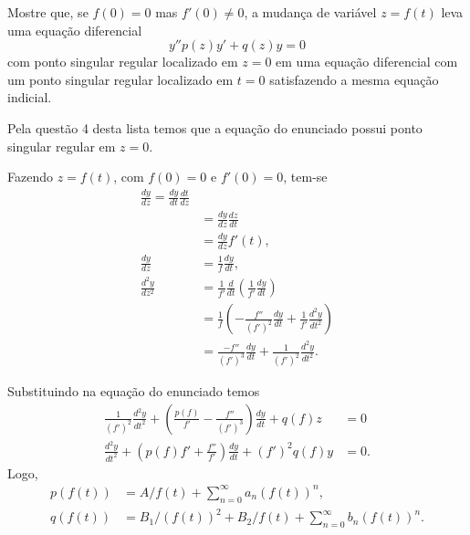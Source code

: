 \documentclass[a4paper,12pt, leqno, answers]{exam}
\begin{document}
\begin{questions}
    \question Mostre que, se $f(0) = 0$ mas $f'(0) \neq 0$, a mudan\c{c}a de vari\'{a}vel $z = f(t)$ leva uma equa\c{c}\~{a}o diferencial
    \[
    y''  p(z) y' + q(z) y = 0
    \]
    com ponto singular regular localizado em $z = 0$ em uma equa\c{c}\~{a}o diferencial com um ponto singular regular localizado em $t = 0$ satisfazendo a mesma equa\c{c}\~{a}o indicial.
    \begin{solution}
        Pela quest\~{a}o 4 desta lista temos que a equa\c{c}\~{a}o do enunciado possui ponto singular regular em $z = 0$.

        Fazendo $z = f(t)$, com $f(0) = 0$ e $f'(0) = 0$, tem-se
        \begin{align*}
            \frac{d y}{d z} = \frac{d y}{d t} \frac{d t}{d z} \\
            &= \frac{d y}{d z} \frac{d z}{d t} \\
            &= \frac{d y}{d z} f'(t), \\
            \frac{d y}{d z} &= \frac{1}{f} \frac{d y}{d t}, \\
            \frac{d^2 y}{d z^2} &= \frac{1}{f'} \frac{d}{d t} \left( \frac{1}{f'} \frac{d y}{d t} \right) \\
            &= \frac{1}{f} \left( - \frac{f''}{\left( f' \right)^2} \frac{d y}{d t} + \frac{1}{f'} \frac{d^2 y}{d t^2} \right) \\
            &= \frac{-f''}{\left( f' \right)^3} \frac{d y}{d t} + \frac{1}{\left( f' \right)^2} \frac{d^2 y}{d t^2}.
        \end{align*}
        
        Substituindo na equa\c{c}\~{a}o do enunciado temos
        \begin{align*}
            \frac{1}{\left( f' \right)^2} \frac{d^2 y}{d t^2} + \left( \frac{p\left( f \right)}{f'} - \frac{f''}{\left( f' \right)^3} \right) \frac{d y}{d t} + q\left( f \right) z &= 0 \\
            \frac{d^2 y}{d t^2} + \left( p(f) f' + \frac{f''}{f'} \right) \frac{d y}{d t} + \left( f' \right)^2 q(f) y &= 0. 
        \end{align*}
        Logo,
        \begin{align*}
            p(f(t)) &= A / f(t) + \sum_{n = 0}^\infty a_n \left( f(t) \right)^n, \\
            q(f(t)) &= B_1 / \left( f(t) \right)^2 + B_2 / f(t) + \sum_{n = 0}^\infty b_n \left( f(t) \right)^n.
        \end{align*}


\end{solution}
\end{questions}
\end{document}
